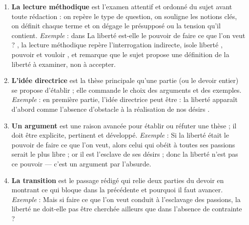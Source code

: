 \documentclass[11pt]{article}
\begin{document}
\begin{corrige}
\begin{enumerate}
\item \textbf{La lecture méthodique} est l'examen attentif et ordonné du sujet avant toute rédaction : on repère le type de question, on souligne les notions clés, on définit chaque terme et on dégage le présupposé ou la tension qu'il contient. \emph{Exemple} : dans \guillemotleft La liberté est-elle le pouvoir de faire ce que l'on veut ? \guillemotright, la lecture méthodique repère l'interrogation indirecte, isole \guillemotleft liberté \guillemotright, \guillemotleft pouvoir \guillemotright et \guillemotleft vouloir \guillemotright, et remarque que le sujet propose une définition de la liberté à examiner, non à accepter.
\item \textbf{L'idée directrice} est la thèse principale qu'une partie (ou le devoir entier) se propose d'établir ; elle commande le choix des arguments et des exemples. \emph{Exemple} : en première partie, l'idée directrice peut être : \guillemotleft la liberté apparaît d'abord comme l'absence d'obstacle à la réalisation de nos désirs \guillemotright.
\item \textbf{Un argument} est une raison avancée pour établir ou réfuter une thèse ; il doit être explicite, pertinent et développé. \emph{Exemple} : \guillemotleft Si la liberté était le pouvoir de faire ce que l'on veut, alors celui qui obéit à toutes ses passions serait le plus libre ; or il est l'esclave de ses désirs ; donc la liberté n'est pas ce pouvoir \guillemotright --- c'est un argument par l'absurde.
\item \textbf{La transition} est le passage rédigé qui relie deux parties du devoir en montrant ce qui bloque dans la précédente et pourquoi il faut avancer. \emph{Exemple} : \guillemotleft Mais si faire ce que l'on veut conduit à l'esclavage des passions, la liberté ne doit-elle pas être cherchée ailleurs que dans l'absence de contrainte ? \guillemotright
\end{enumerate}
\end{corrige}
\end{document}
